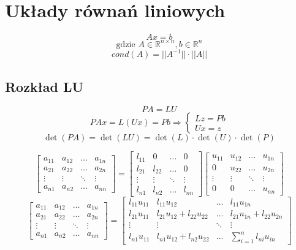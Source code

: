 \documentclass[../mn-notatki.tex]{subfiles}
\begin{document}
\section{Układy równań liniowych}

\begin{tcolorbox}
\[
Ax = b
\]
\[
\text{gdzie } A \in \mathbb{R}^{n \times n}, b \in \mathbb{R}^n
\]
\[
cond(A) = ||A^{-1}||\cdot ||A||
\]
\end{tcolorbox}

\subsection{Rozkład LU}

\begin{tcolorbox}
\[
PA = LU
\]
\[
PAx = L(Ux) = Pb \Rightarrow \begin{cases}
Lz = Pb\\
Ux = z
\end{cases}
\]
\[
\det(PA) = \det(LU) = \det(L)\cdot\det(U)\cdot\det(P)
\]
\end{tcolorbox}

\[
\begin{bmatrix}
a_{11} & a_{12} & \ldots & a_{1n}\\
a_{21} & a_{22} & \ldots & a_{2n}\\
\vdots & \vdots & \ddots & \vdots\\
a_{n1} & a_{n2} & \ldots & a_{nn}
\end{bmatrix}
=
\begin{bmatrix}
l_{11} & 0 & \ldots & 0\\
l_{21} & l_{22} & \ldots & 0\\
\vdots & \vdots & \ddots & \vdots\\
l_{n1} & l_{n2} & \ldots & l_{nn}
\end{bmatrix}
\begin{bmatrix}
u_{11} & u_{12} & \ldots & u_{1n}\\
0      & u_{22} & \ldots & u_{2n}\\
\vdots & \vdots & \ddots & \vdots\\
0      & 0      & \ldots & u_{nn}
\end{bmatrix}
\]
\[
\begin{bmatrix}
a_{11} & a_{12} & \ldots & a_{1n}\\
a_{21} & a_{22} & \ldots & a_{2n}\\
\vdots & \vdots & \ddots & \vdots\\
a_{n1} & a_{n2} & \ldots & a_{nn}
\end{bmatrix}
=
\begin{bmatrix}
l_{11}u_{11} & l_{11}u_{12} & \ldots & l_{11}u_{1n}\\
l_{21}u_{11} & l_{21}u_{12} + l_{22}u_{22} & \ldots & l_{21}u_{1n} + l_{22}u_{2n}\\
\vdots & \vdots & \ddots & \vdots\\
l_{n1}u_{11} & l_{n1}u_{12} + l_{n2}u_{22} & \ldots & \sum_{i=1}^{n} l_{ni}u_{in}
\end{bmatrix}
\]
\end{document}
